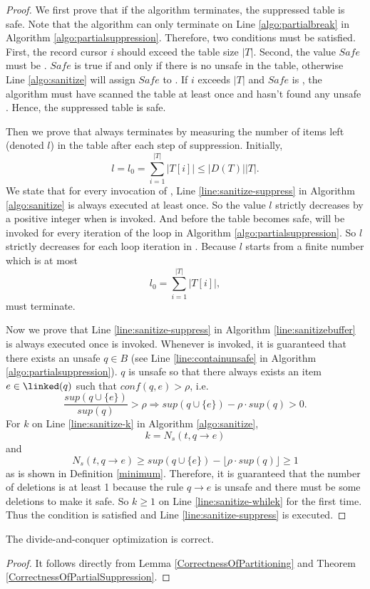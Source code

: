\begin{proof}
We first prove that if the algorithm terminates, the suppressed table is safe.
Note that the algorithm can only terminate on Line \ref{algo:partialbreak}
  in Algorithm \ref{algo:partialsuppression}.
  Therefore, two conditions must be satisfied. First, the record cursor
$i$ should exceed the table size $|T|$. Second, the value $Safe$ must be \TRUE.
$Safe$ is true if and only if there is no unsafe \qids in the table, otherwise  Line \ref{algo:sanitize}
 will assign $Safe$ to \FALSE. If $i$ exceeds $|T|$ and
$Safe$ is \TRUE, the algorithm
must have scanned the table at least once and
hasn't found any unsafe \qids. Hence,
the suppressed table is safe.

Then we prove that \PartialSuppression always terminates by measuring the
  number of items left (denoted $l$) in the table after each step of suppression.
Initially, \[l=l_0=\sum_{i=1}^{|T|} |T[i]|\le |D(T)| |T|.\]
We state that for every invocation of \SanitizeBuffer, Line \ref{line:sanitize-suppress}
  in Algorithm \ref{algo:sanitize} is always executed at least once.
So the value $l$ strictly decreases by a positive integer
when \SanitizeBuffer is invoked.
And before the table becomes safe, \SanitizeBuffer will be invoked for
  every iteration of the loop in Algorithm \ref{algo:partialsuppression}.
So $l$ strictly decreases for each loop iteration in \PartialSuppressor.
Because $l$ starts from a finite number which is at most
\[l_0=\sum_{i=1}^{|T|} |T[i]|,\]
\PartialSuppressor must terminate.

Now we prove that Line \ref{line:sanitize-suppress} in Algorithm \ref{line:sanitizebuffer}
  is always executed once \SanitizeBuffer is invoked.
Whenever \SanitizeBuffer is invoked, it is guaranteed that there exists
  an unsafe \qid $q\in B$ (see Line \ref{line:containunsafe}  in Algorithm \ref{algo:partialsuppression}).
$q$ is unsafe so that there always exists an item $e\in\linked(q)$ such that $conf(q,e)>\rho$,
  i.e. \[ \frac{sup(q\cup\{e\})}{sup(q)}>\rho \Rightarrow
   sup(q\cup\{e\})-\rho\cdot sup(q)>0 .\]
For $k$ on Line \ref{line:sanitize-k} in Algorithm \ref{algo:sanitize},
  \[ k = N_s(t, q\rightarrow e)\]
  and
  \[N_s(t, q\rightarrow e) \geq sup(q\cup\{e\})-\lfloor\rho\cdot sup(q)\rfloor \ge 1\]
  as is shown in Definition \ref{minimum}. Therefore,
  it is guaranteed that the number of deletions is at least 1
  because the rule $q\rightarrow e$ is unsafe and there must be some deletions to make it safe.
So $k\ge 1$ on Line \ref{line:sanitize-whilek} for the first time.
Thus the condition is satisfied and Line \ref{line:sanitize-suppress} is executed.
\end{proof}
\begin{corollary}
The divide-and-conquer optimization \SplitData is correct.
\end{corollary}
\begin{proof}
It follows directly from Lemma \ref{CorrectnessOfPartitioning} and
Theorem \ref{CorrectnessOfPartialSuppression}.
\end{proof}

